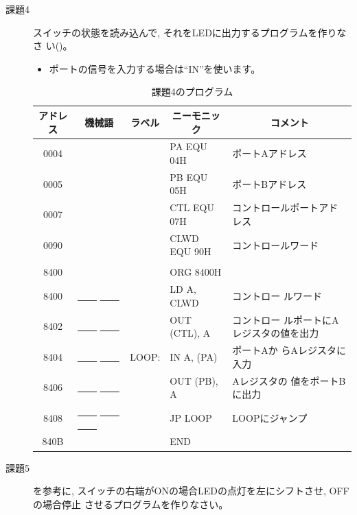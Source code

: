 \begin{description}
\item[課題4] スイッチの状態を読み込んで, それをLEDに出力するプログラムを作りなさ
           い()。


\begin{itemize}
\item ポートの信号を入力する場合は``IN''を使います。
\end{itemize}

\begin{table}
\begin{center}
\caption{課題4のプログラム}
\label{tab:q2-4}
\footnotesize
\begin{tabular}{|c|l|ll|l|}
\hline
アドレス& \multicolumn{1}{|c|}{機械語}&\multicolumn{1}{|c}{ラベル}&\multicolumn{1}{c|}{ニーモニック}&\multicolumn{1}{|c|}{コメント}\\
\hline
   0004 &           & & PA EQU 04H& ポートAアドレス\\
   0005 &           & & PB EQU 05H& ポートBアドレス\\
   0007 &           & & CTL EQU 07H& コントロールポートアドレス\\
   0090 &           & & CLWD EQU 90H& コントロールワード\\
        &           & & &\\
   8400 &           & &     ORG 8400H&\\
   8400 & \underline{~~~~} \underline{~~~~}      & &     LD A, CLWD& コントロー
                    ルワード\\
   8402 & \underline{~~~~} \underline{~~~~}      & &     OUT (CTL), A& コントロー
                    ルポートにAレジスタの値を出力\\
   8404 & \underline{~~~~} \underline{~~~~}      &  LOOP:& IN A, (PA)& ポートAか
                    らAレジスタに入力\\
   8406 & \underline{~~~~} \underline{~~~~}     & &     OUT (PB), A& Aレジスタの
                    値をポートBに出力\\
   8408 & \underline{~~~~} \underline{~~~~} \underline{~~~~}   & &     JP LOOP&
                    LOOPにジャンプ\\
   840B &           & &     END&\\
\hline
\end{tabular}
\end{center}
\end{table}


\item[課題5] を参考に, スイッチの右端がONの場合LEDの点灯を左にシフトさせ, OFFの場合停止
           させるプログラムを作りなさい。



\end{description}
